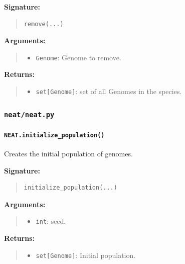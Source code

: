 \documentclass[11pt]{article}
\begin{document}
\textbf{Signature:}
\begin{quote}
\begin{verbatim}
remove(...)
\end{verbatim}
\end{quote}

\textbf{Arguments:}
\begin{quote}
\begin{itemize}
    \item \texttt{Genome}: Genome to remove.
\end{itemize}
\end{quote}

\textbf{Returns:}
\begin{quote}
\begin{itemize}
    \item \texttt{set[Genome]}: set of all Genomes in the species.
\end{itemize}
\end{quote}


\subsubsection{\texttt{neat/neat.py}}

\paragraph{\texttt{NEAT.initialize\_population()}}

Creates the initial population of genomes.

\textbf{Signature:}
\begin{quote}
\begin{verbatim}
initialize_population(...)
\end{verbatim}
\end{quote}

\textbf{Arguments:}
\begin{quote}
\begin{itemize}
    \item \texttt{int}: seed.
\end{itemize}
\end{quote}

\textbf{Returns:}
\begin{quote}
\begin{itemize}
    \item \texttt{set[Genome]}: Initial population.
\end{itemize}
\end{quote}
\end{document}
